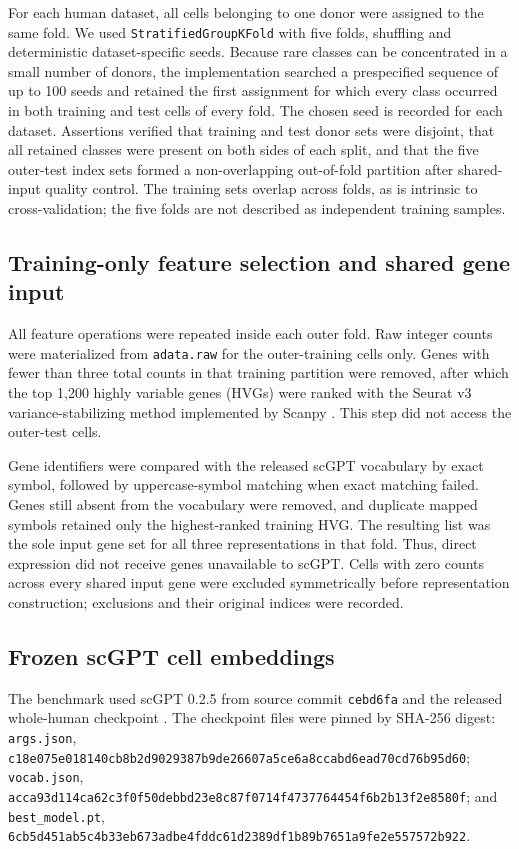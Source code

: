 For each human dataset, all cells belonging to one donor were assigned to the same fold. We used \texttt{StratifiedGroupKFold} with five folds, shuffling and deterministic dataset-specific seeds. Because rare classes can be concentrated in a small number of donors, the implementation searched a prespecified sequence of up to 100 seeds and retained the first assignment for which every class occurred in both training and test cells of every fold. The chosen seed is recorded for each dataset. Assertions verified that training and test donor sets were disjoint, that all retained classes were present on both sides of each split, and that the five outer-test index sets formed a non-overlapping out-of-fold partition after shared-input quality control. The training sets overlap across folds, as is intrinsic to cross-validation; the five folds are not described as independent training samples.

\subsection{Training-only feature selection and shared gene input}

All feature operations were repeated inside each outer fold. Raw integer counts were materialized from \texttt{adata.raw} for the outer-training cells only. Genes with fewer than three total counts in that training partition were removed, after which the top 1,200 highly variable genes (HVGs) were ranked with the Seurat v3 variance-stabilizing method implemented by Scanpy \citep{Stuart2019,Wolf2018}. This step did not access the outer-test cells.

Gene identifiers were compared with the released scGPT vocabulary by exact symbol, followed by uppercase-symbol matching when exact matching failed. Genes still absent from the vocabulary were removed, and duplicate mapped symbols retained only the highest-ranked training HVG. The resulting list was the sole input gene set for all three representations in that fold. Thus, direct expression did not receive genes unavailable to scGPT. Cells with zero counts across every shared input gene were excluded symmetrically before representation construction; exclusions and their original indices were recorded.

\subsection{Frozen scGPT cell embeddings}

The benchmark used scGPT 0.2.5 from source commit \texttt{cebd6fa} and the released whole-human checkpoint \citep{Cui2024}. The checkpoint files were pinned by SHA-256 digest: \texttt{args.json}, \nolinkurl{c18e075e018140cb8b2d9029387b9de26607a5ce6a8ccabd6ead70cd76b95d60}; \texttt{vocab.json}, \nolinkurl{acca93d114ca62c3f0f50debbd23e8c87f0714f4737764454f6b2b13f2e8580f}; and \texttt{best\_model.pt}, \nolinkurl{6cb5d451ab5c4b33eb673adbe4fddc61d2389df1b89b7651a9fe2e557572b922}.


